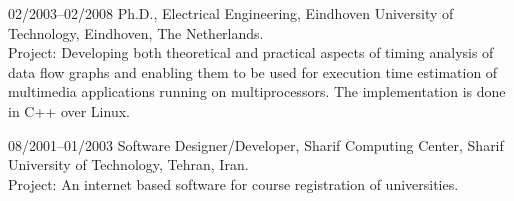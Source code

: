 \begin{CV}
\item[02/2003--02/2008] Ph.D., Electrical Engineering, Eindhoven
University of Technology, Eindhoven, The Netherlands.\\
\ifindustry
Project: Developing both theoretical and practical aspects of timing analysis of data flow graphs
and enabling them to be used for execution time estimation of multimedia applications running on multiprocessors.
The implementation is done in C++ over Linux.
\fi

\item[08/2001--01/2003] Software Designer/Developer, Sharif Computing Center, Sharif University of Technology, Tehran,
Iran.\\
\ifindustry
Project: An internet based software for course registration of
universities.
\fi
\end{CV}
